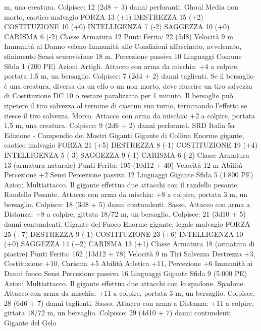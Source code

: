 \begin{multicols}{2}
m, una creatura.
Colpisce: 12 (2d8 + 3) danni perforanti.
Ghoul
Media non morto, caotico malvagio
FORZA 13 (+1)
DESTREZZA 15 (+2)
COSTITUZIONE 10 (+0)
INTELLIGENZA 7 (-2)
SAGGEZZA 10 (+0)
CARISMA 6 (-2)
Classe Armatura 12
\hspace*{0pt}\hfill{Punti Ferita}: 22 (5d8)
Velocità 9 m
Immunità al Danno veleno
Immunità alle Condizioni affascinato, avvelenato, sfinimento
Sensi scurovisione 18 m, Percezione passiva 10
Linguaggi Comune
Sfida 1 (200 PE)
Azioni
Artigli. Attacco con arma da mischia: +4 a colpire, portata 1,5
m, un bersaglio.
Colpisce: 7 (2d4 + 2) danni taglienti. Se il bersaglio è una
creatura, diversa da un elfo o un non morto, deve riuscire un tiro
salvezza di Costituzione DC 10 o restare paralizzata per 1
minuto. Il bersaglio può ripetere il tiro salvezza al termine di
ciascun suo turno, terminando l’effetto se riesce il tiro salvezza.
Morso. Attacco con arma da mischia: +2 a colpire, portata 1,5
m, una creatura.
Colpisce: 9 (2d6 + 2) danni perforanti.
SRD Italia 5a Edizione - Compendio dei Mostri
Giganti
Gigante di Collina
Enorme gigante, caotico malvagio
FORZA 21 (+5)
DESTREZZA 8 (-1)
COSTITUZIONE 19 (+4)
INTELLIGENZA 5 (-3)
SAGGEZZA 9 (-1)
CARISMA 6 (-2)
Classe Armatura 13 (armatura naturale)
\hspace*{0pt}\hfill{Punti Ferita}: 105 (10d12 + 40)
Velocità 12 m
Abilità Percezione +2
Sensi Percezione passiva 12
Linguaggi Gigante
Sfida 5 (1.800 PE)
Azioni
Multiattacco. Il gigante effettua due attacchi con il randello pesante.
Randello Pesante. Attacco con arma da mischia: +8 a colpire,
portata 3 m, un bersaglio.
Colpisce: 18 (3d8 + 5) danni contundenti.
Sasso. Attacco con arma a Distanza: +8 a colpire, gittata 18/72
m, un bersaglio.
Colpisce: 21 (3d10 + 5) danni contundenti.
Gigante del Fuoco
Enorme gigante, legale malvagio
FORZA 25 (+7)
DESTREZZA 9 (-1)
COSTITUZIONE 23 (+6)
INTELLIGENZA 10 (+0)
SAGGEZZA 14 (+2)
CARISMA 13 (+1)
Classe Armatura 18 (armatura di piastre)
\hspace*{0pt}\hfill{Punti Ferita}: 162 (13d12 + 78)
Velocità 9 m
Tiri Salvezza Destrezza +3, Costituzione +10, Carisma +5
Abilità Atletica +11, Percezione +6
Immunità ai Danni fuoco
Sensi Percezione passiva 16
Linguaggi Gigante
Sfida 9 (5.000 PE)
Azioni
Multiattacco. Il gigante effettua due attacchi con lo spadone.
Spadone. Attacco con arma da mischia: +11 a colpire, portata 3
m, un bersaglio.
Colpisce: 28 (6d6 + 7) danni taglienti.
Sasso. Attacco con arma a Distanza: +11 a colpire, gittata 18/72
m, un bersaglio.
Colpisce: 29 (4d10 + 7) danni contundenti.
Gigante del Gelo

\end{multicols}
